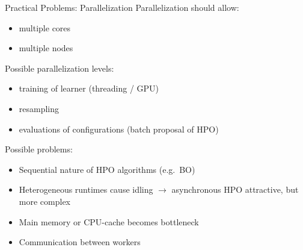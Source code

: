 	\begin{frame}{Practical Problems: Parallelization}
		Parallelization should allow:
		\begin{itemize}
			\item multiple cores
			\item multiple nodes 
		\end{itemize}
		
		Possible parallelization levels:
		\begin{itemize}
			\item training of learner (threading / GPU)
			\item resampling
			\item evaluations of configurations (batch proposal of HPO)
		\end{itemize}
		
		Possible problems:
		\begin{itemize}
			\item Sequential nature of HPO algorithms (e.g.\ BO)
			\item Heterogeneous runtimes cause idling $\longrightarrow$ 
			asynchronous HPO attractive, but more complex
			\item Main memory or CPU-cache becomes bottleneck
			\item Communication between workers
		\end{itemize}
		
	\end{frame}
	
	

